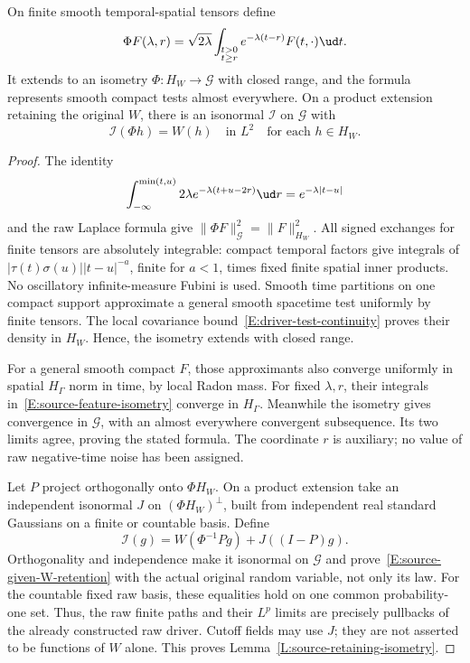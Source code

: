 \begin{lemma}\label{L:source-retaining-isometry}
  On finite smooth temporal-spatial tensors define
  \begin{equation}\label{E:source-feature-isometry}
    \Phi F(\lambda,r)=\sqrt{2\lambda}
    \int_{\substack{t>0\\t\ge r}}e^{-\lambda(t-r)}F(t,\cdot)\ud t.
  \end{equation}
  It extends to an isometry $\Phi:H_W\to\mathcal G$ with closed range,
  and the formula represents smooth compact tests almost everywhere.
  On a product extension retaining the original $W$, there is an isonormal
  $\mathcal I$ on $\mathcal G$ with
  \begin{equation}\label{E:source-given-W-retention}
    \mathcal I(\Phi h)=W(h)\quad\text{in }L^2
    \quad\text{for each }h\in H_W.
  \end{equation}
\end{lemma}

\begin{proof}
  The identity
  \[
    \int_{-\infty}^{\min(t,u)}
    2\lambda e^{-\lambda(t+u-2r)}\ud r
    =e^{-\lambda|t-u|}
  \]
  and the raw Laplace formula give
  $\|\Phi F\|_{\mathcal G}^2=\|F\|_{H_W}^2$.
  All signed exchanges for finite tensors are absolutely integrable:
  compact temporal factors give integrals of
  $|\tau(t)\sigma(u)||t-u|^{-a}$, finite for $a<1$, times fixed finite
  spatial inner products. No oscillatory infinite-measure Fubini is used.
  Smooth time partitions on one compact support approximate a general
  smooth spacetime test uniformly by finite tensors. The local covariance
  bound~\eqref{E:driver-test-continuity} proves their density in $H_W$.
  Hence, the isometry extends with closed range.

  For a general smooth compact $F$, those approximants also converge
  uniformly in spatial $H_\Gamma$ norm in time, by local Radon mass.
  For fixed $\lambda,r$, their integrals in~\eqref{E:source-feature-isometry}
  converge in $H_\Gamma$. Meanwhile the isometry gives convergence in
  $\mathcal G$, with an almost everywhere convergent subsequence. Its
  two limits agree, proving the stated formula. The coordinate $r$ is
  auxiliary; no value of raw negative-time noise has been assigned.

  Let $P$ project orthogonally onto $\Phi H_W$. On a product extension
  take an independent isonormal $J$ on $(\Phi H_W)^\perp$, built from
  independent real standard Gaussians on a finite or countable basis.
  Define
  \[
    \mathcal I(g)=W(\Phi^{-1}Pg)+J((I-P)g).
  \]
  Orthogonality and independence make it isonormal on $\mathcal G$ and
  prove~\eqref{E:source-given-W-retention} with the actual original random
  variable, not only its law. For the countable fixed raw basis, these
  equalities hold on one common probability-one set. Thus, the raw
  finite paths and their $L^p$ limits are precisely pullbacks of the
  already constructed raw driver. Cutoff fields may use $J$; they are
  not asserted to be functions of $W$ alone.
  This proves Lemma~\ref{L:source-retaining-isometry}.
\end{proof}

